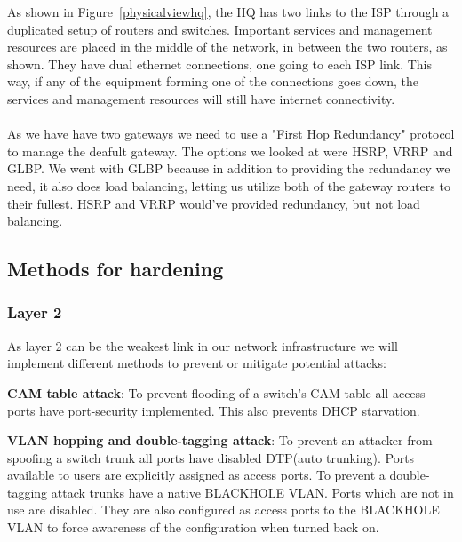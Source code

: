 As shown in Figure~\ref{physicalviewhq}, the HQ has two links to the ISP through a duplicated setup of routers and switches. Important services and management resources are placed in the middle of the network, in between the two routers, as shown. They have dual ethernet connections, one going to each ISP link. This way, if any of the equipment forming one of the connections goes down, the services and management resources will still have internet connectivity.
\\
\\
As we have have two gateways we need to use a "First Hop Redundancy" protocol to manage the deafult gateway. The options we looked at were HSRP, VRRP and GLBP. We went with GLBP because in addition to providing the redundancy we need, it also does load balancing, letting us utilize both of the gateway routers to their fullest. HSRP and VRRP would've provided redundancy, but not load balancing.




\subsection{Methods for hardening}

\subsubsection{Layer 2}
As layer 2 can be the weakest link in our network infrastructure we will implement different methods to prevent or mitigate potential attacks:

\textbf{CAM table attack}: To prevent flooding of a switch's CAM table all access ports have port-security implemented. This also prevents DHCP starvation.

\textbf{VLAN hopping and double-tagging attack}: To prevent an attacker from spoofing a switch trunk all ports have disabled DTP(auto trunking). Ports available to users are explicitly assigned as access ports. To prevent a double-tagging attack trunks have a native BLACKHOLE VLAN. Ports which are not in use are disabled. They are also configured as access ports to the BLACKHOLE VLAN to force awareness of the configuration when turned back on.

